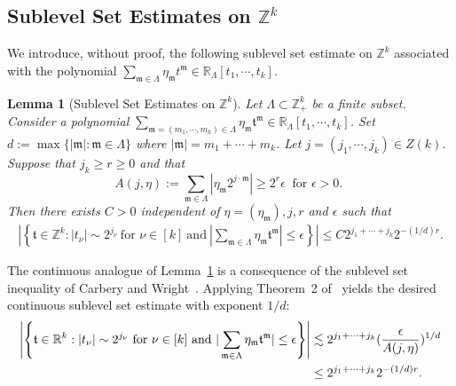 \documentclass[10pt,a4paper]{amsart}
\newtheorem{lemma}{Lemma}\numberwithin{lemma}{section}
\numberwithin{equation}{section}
\begin{document}
 

	

 
 
 
 
 
 
 
 
 
 
 
 
 
  



 

\subsection{Sublevel Set Estimates on $\mathbb{Z}^k$}
We introduce, without proof, the following sublevel set estimate on $\mathbb{Z}^k$ associated with the polynomial
$
\sum_{\mathfrak{m}\in\Lambda}\eta_{\mathfrak{m}}t^{\mathfrak{m}}\in \mathbb{R}_{\Lambda}[t_1,\cdots,t_k].
$

\begin{lemma}[Sublevel Set Estimates on $\mathbb{Z}^k$]\label{eep1}
	Let $\Lambda\subset \mathbb{Z}^k_+$ be a finite subset. Consider a polynomial $\sum_{\mathfrak{m}=(m_1,\cdots,m_k)\in \Lambda}\eta_\mathfrak{m}\mathfrak{t}^\mathfrak{m}\in \mathbb{R}_{\Lambda}[t_1,\cdots,t_k]$. Set $
	d:=\max\{|\mathfrak{m}|:\mathfrak{m}\in \Lambda\}$ where $|\mathfrak{m}|=m_1+\cdots+m_k$.
	Let   $j=(j_1,\cdots,j_k)\in Z(k)$.  Suppose    that $ j_k \ge r\ge 0$ and that $$A(j,\eta):=\sum_{\mathfrak{m}\in \Lambda}|\eta_\mathfrak{m}2^{j\cdot \mathfrak{m}} |\ge 2^r\epsilon\ \text{ for $\epsilon>0$. }$$ Then there exists $ C >0$  independent of $\eta=(\eta_{\mathfrak{m}}),j,r$ and $\epsilon$  such that
	\begin{align*}
		\left|\left\{\mathfrak{t}\in \mathbb{Z}^k:|t_\nu|\sim 2^{j_\nu}\ \text{for $\nu\in [k]$}\ \text{and}\  |\sum_{\mathfrak{m}\in \Lambda}\eta_{\mathfrak{m}}\mathfrak{t}^\mathfrak{m}|\le \epsilon\right\} \right|\le C  2^{j_1+\cdots+j_k} 2^{-(1/d)r}.
	\end{align*}
\end{lemma}

The continuous analogue of Lemma~\ref{eep1} is a  consequence of
the sublevel set inequality of Carbery and Wright~\cite{CW}.
Applying Theorem~2 of~\cite{CW} yields the desired continuous sublevel set
estimate with exponent $1/d$: \begin{align*}
	\left|\left\{\mathfrak{t}\in \mathbb{R}^k:|t_\nu|\sim 2^{j_\nu}\ \text{for $\nu\in [k]$}\ \text{and}\  |\sum_{\mathfrak{m}\in \Lambda}\eta_{\mathfrak{m}}\mathfrak{t}^\mathfrak{m}|\le \epsilon\right\} \right|&\lesssim 2^{j_1+\cdots+j_k}(\frac{\epsilon}{A(j,\eta)})^{1/d}\\
	&\le   2^{j_1+\cdots+j_k} 2^{-(1/d)r}.\notag
\end{align*}
 
\end{document}
